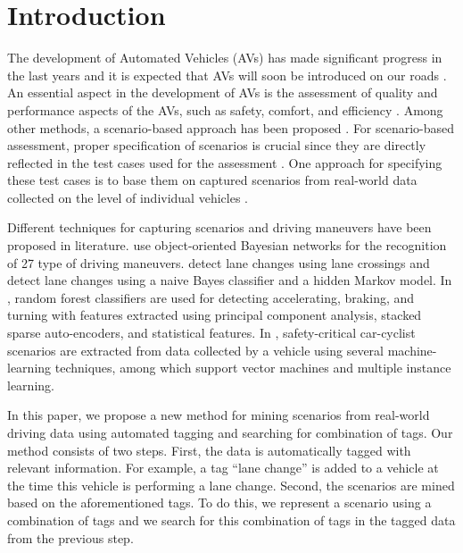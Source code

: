 \section{Introduction}
\label{sec:introduction}

\cstarta
The development of Automated Vehicles (AVs) has made significant progress in the last years and it is expected that AVs will soon be introduced on our roads \autocite{bimbraw2015autonomous, madni2018autonomous}. 
An essential aspect in the development of AVs is the assessment of quality and performance aspects of the AVs, such as safety, comfort, and efficiency \autocite{bengler2014threedecades, stellet2015taxonomy}. 
Among other methods, a scenario-based approach has been proposed \autocite{elrofai2018scenario, putz2017pegasus}. 
For scenario-based assessment, proper specification of scenarios is crucial since they are directly reflected in the test cases used for the assessment \autocite{stellet2015taxonomy}. 
One approach for specifying these test cases is to base them on captured scenarios from real-world data collected on the level of individual vehicles \autocite{elrofai2018scenario, putz2017pegasus, roesener2016scenariobased, deGelder2017assessment}. 

Different techniques for capturing scenarios and driving maneuvers have been proposed in literature. 
\textcite{kasper2012oobayesnetworks} use object-oriented Bayesian networks for the recognition of 27 type of driving maneuvers. 
\textcite{krajewski2018highD} detect lane changes using lane crossings and \textcite{schlechtriemen2015lanechange} detect lane changes using a naive Bayes classifier and a hidden Markov model. 
In \autocite{xie2017driving}, random forest classifiers are used for detecting accelerating, braking, and turning with features extracted using principal component analysis, stacked sparse auto-encoders, and statistical features.
In \autocite{cara2015carcyclist}, safety-critical car-cyclist scenarios are extracted from data collected by a vehicle using several machine-learning techniques, among which support vector machines and multiple instance learning.

In this paper, we propose a new method for mining scenarios from real-world driving data using automated tagging and searching for combination of tags. 
Our method consists of two steps. 
First, the data is automatically tagged with relevant information. For example, a tag ``lane change'' is added to a vehicle at the time this vehicle is performing a lane change. 
Second, the scenarios are mined based on the aforementioned tags. \cenda
\cstartd To do this, we represent a scenario using a combination of tags and we search for this combination of tags in the tagged data from the previous step. \cendd

